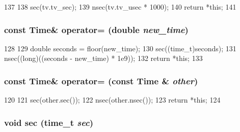 \begin{DoxyCode}
137     {
138         sec(tv.tv_sec);
139         nsec(tv.tv_usec * 1000);
140         return *this;
141     }
\end{DoxyCode}
\hypertarget{classTime_a5ff73453339e093cb1b66366e19fad23}{
\subsubsection[{operator=}]{\setlength{\rightskip}{0pt plus 5cm}const {\bf Time}\& operator= (double {\em new\_\-time})}}
\label{classTime_a5ff73453339e093cb1b66366e19fad23}



\begin{DoxyCode}
128     {
129         double seconds = floor(new_time);
130         sec((time_t)seconds);
131         nsec((long)((seconds - new_time) * 1e9));
132         return *this;
133     }
\end{DoxyCode}
\hypertarget{classTime_a2342dc0583b5a80a244384a8a1e7f19e}{
\subsubsection[{operator=}]{\setlength{\rightskip}{0pt plus 5cm}const {\bf Time}\& operator= (const {\bf Time} \& {\em other})}}
\label{classTime_a2342dc0583b5a80a244384a8a1e7f19e}



\begin{DoxyCode}
120     {
121         sec(other.sec());
122         nsec(other.nsec());
123         return *this;
124     }
\end{DoxyCode}
\hypertarget{classTime_aba2fa84032481bb1a61d605a23334811}{
\subsubsection[{sec}]{\setlength{\rightskip}{0pt plus 5cm}void sec (time\_\-t {\em sec})}}
\label{classTime_aba2fa84032481bb1a61d605a23334811}



